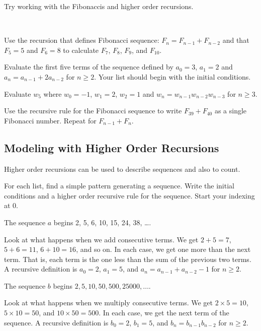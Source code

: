 Try working with the Fibonaccis and higher order recursions.

\begin{act}
\label{act_eval_model_higher_order}
~
    \begin{actpart}
        \item Use the recursion that defines Fibonacci sequence: $F_n=F_{n-1}+F_{n-2}$ and that $F_5=5$ and $F_6=8$ to calculate $F_7$, $F_8$, $F_9$, and $F_{10}$.
        \item Evaluate the first five terms of the sequence defined by $a_0=3$, $a_1=2$ and $a_n = a_{n-1}+2a_{n-2}$ for $n \ge 2$. Your list should begin with the initial conditions.  
        \item Evaluate $w_5$ where $w_0=-1$, $w_1=2$, $w_2=1$ and $w_n = w_{n-1}w_{n-2}w_{n-3}$ for $n \ge 3$.
        \item Use the recursive rule for the Fibonacci sequence to write $F_{39} + F_{40}$ as a single Fibonacci number.  Repeat for $F_{n-1} + F_n$.
    \end{actpart}
\end{act}


\newcommand{\submodelhigher}{Modeling with Higher Order Recursions}
\subsection{\submodelhigher}
\label{sub_model_higher_order_rec}

Higher order recursions can be used to describe sequences and also to count.

\begin{exam}
\label{exam_ntr_higher}
    For each list, find a simple pattern generating a sequence.  Write the initial conditions and a higher order recursive rule for the sequence. Start your indexing at 0. 
        \begin{apart}
            \item The sequence $a$ begins 2, 5, 6, 10, 15, 24, 38, \ldots.
                \begin{soln}
                    Look at what happens when we add consecutive terms.  We get $2+5=7$, $5+6=11$, $6+10=16$, and so on.  In each case, we get one more than the next term.  That is, each term is the one less than the sum of the previous two terms.  A recursive definition is $a_0=2$, $a_1=5$, and $a_n=a_{n-1}+a_{n-2}-1$ for $n \ge 2$.
                \end{soln}
            \item The sequence $b$ begins $2, 5, 10, 50, 500, 25000, \ldots$.
                \begin{soln}
                    Look at what happens when we multiply consecutive terms. We get $2 \times  5= 10$, $5 \times 10=50$, and $10 \times 50 = 500$. In each case, we get the next term of the sequence. A recursive definition is $b_0=2$, $b_1=5$, and $b_n=b_{n-1}b_{n-2}$ for $n \ge 2$.
                \end{soln}
       \end{apart}
\end{exam}

